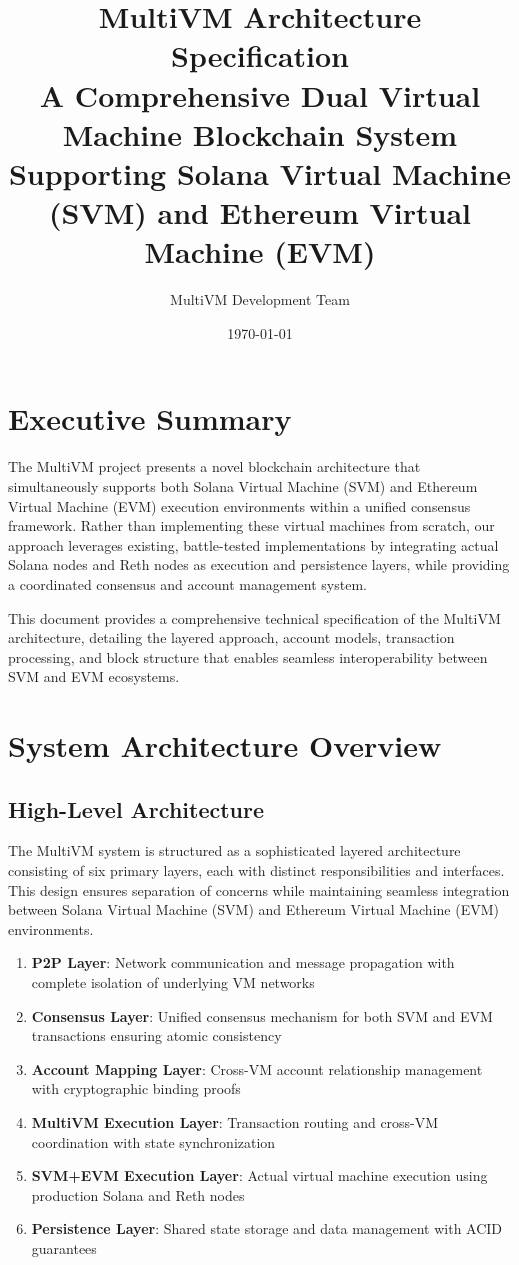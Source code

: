 \documentclass[11pt,a4paper]{article}
\title{\textbf{MultiVM Architecture Specification} \\ 
       \large{A Comprehensive Dual Virtual Machine Blockchain System} \\
       \large{Supporting Solana Virtual Machine (SVM) and Ethereum Virtual Machine (EVM)}}
\author{MultiVM Development Team}
\date{\today}
\begin{document}
\maketitle

\tableofcontents
\newpage

\section{Executive Summary}

The MultiVM project presents a novel blockchain architecture that simultaneously supports both Solana Virtual Machine (SVM) and Ethereum Virtual Machine (EVM) execution environments within a unified consensus framework. Rather than implementing these virtual machines from scratch, our approach leverages existing, battle-tested implementations by integrating actual Solana nodes and Reth nodes as execution and persistence layers, while providing a coordinated consensus and account management system.

This document provides a comprehensive technical specification of the MultiVM architecture, detailing the layered approach, account models, transaction processing, and block structure that enables seamless interoperability between SVM and EVM ecosystems.

\section{System Architecture Overview}

\subsection{High-Level Architecture}

The MultiVM system is structured as a sophisticated layered architecture consisting of six primary layers, each with distinct responsibilities and interfaces. This design ensures separation of concerns while maintaining seamless integration between Solana Virtual Machine (SVM) and Ethereum Virtual Machine (EVM) environments.

\begin{enumerate}
    \item \textbf{P2P Layer}: Network communication and message propagation with complete isolation of underlying VM networks
    \item \textbf{Consensus Layer}: Unified consensus mechanism for both SVM and EVM transactions ensuring atomic consistency
    \item \textbf{Account Mapping Layer}: Cross-VM account relationship management with cryptographic binding proofs
    \item \textbf{MultiVM Execution Layer}: Transaction routing and cross-VM coordination with state synchronization
    \item \textbf{SVM+EVM Execution Layer}: Actual virtual machine execution using production Solana and Reth nodes
    \item \textbf{Persistence Layer}: Shared state storage and data management with ACID guarantees
\end{enumerate}
\end{document}
